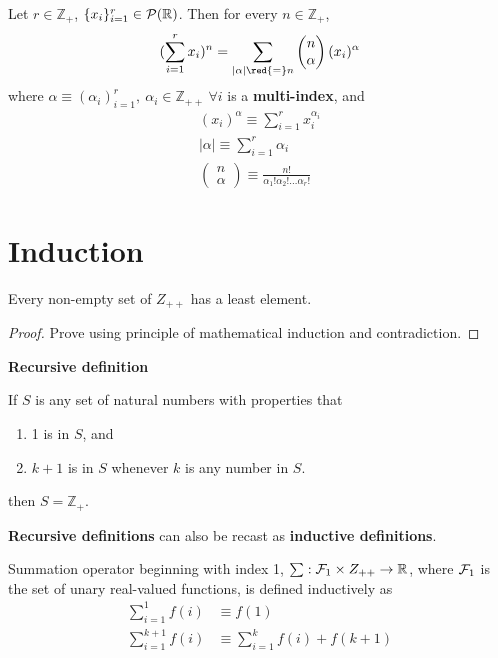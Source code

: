 \documentclass{article}
\def\Z{{\mathbb Z}}
\def\R{{\mathbb R}}
\newcommand{\bi}[2]{\begin{pmatrix}{#1}\\{#2}\end{pmatrix}}
\begin{document}
		\begin{theorem}
			Let $r \in \Z_+$, $\{x_i\}_{i=1}^r \in \mc{P}(\R)$. Then for every $n \in \Z_+$,
			\begin{equation}
				(\sum_{i=1}^r x_i)^n = \sum_{|\alpha|\red{=}n} \bi{n}{\alpha} (x_i)^\alpha
			\end{equation}
			where $\alpha \equiv (\alpha_i)_{i=1}^r,\ \alpha_i \in \Z_{++}\ \forall i$ is a \textbf{multi-index}, and 
			\begin{gather}
				(x_i)^\alpha \equiv \sum_{i=1}^r x_i^{\alpha_i} \\
				|\alpha| \equiv \sum_{i=1}^r \alpha_i \\
				\bi{n}{\alpha} \equiv \frac{n!}{\alpha_1!\alpha_2!\dots\alpha_r!}
			\end{gather}
		\end{theorem}
		
	\section{Induction}
		\begin{theorem}
			Every non-empty set of $Z_{++}$ has a least element.
			\begin{proof}
				Prove using principle of mathematical induction and contradiction.
			\end{proof}
		\end{theorem}
		
		\begin{definition}
			\textbf{Recursive definition}
		\end{definition}
		
		\begin{theorem}
			If $S$ is any set of natural numbers with properties that
			\begin{enumerate}
				\item 1 is in $S$, and
				\item $k+1$ is in $S$ whenever $k$ is any number in $S$.
			\end{enumerate}
			then $S = \Z_+$.
		\end{theorem}
		
		\begin{remark}
			\textbf{Recursive definitions} can also be recast as \textbf{inductive definitions}.
		\end{remark}
		
		\begin{definition}[Summation]
			Summation operator beginning with index 1, $\sum: \mc{F}_1 \times Z_{++} \to \R$, where $\mathcal{{F}}_1$ is the set of unary real-valued functions, is defined inductively as
			\begin{align}
				\sum_{i=1}^1 f(i) &\equiv f(1) \\
				\sum_{i=1}^{k+1} f(i) &\equiv \sum_{i=1}^k f(i) + f(k+1)
			\end{align}
		\end{definition}
		
\end{document}
